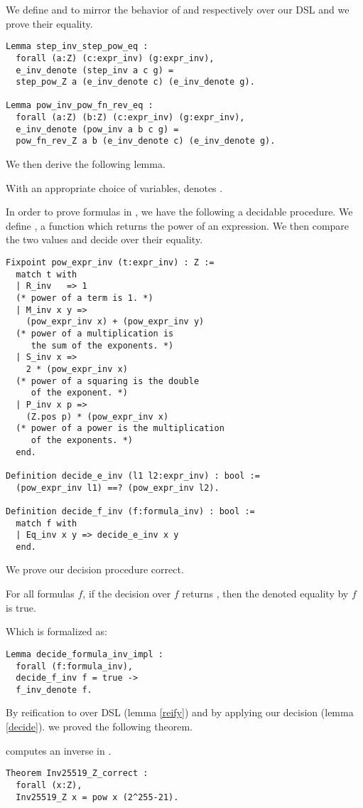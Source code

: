 We define  and  to mirror the behavior of
 and respectively  over our DSL and
we prove their equality.
\begin{lstlisting}[language=Coq]
Lemma step_inv_step_pow_eq :
  forall (a:Z) (c:expr_inv) (g:expr_inv),
  e_inv_denote (step_inv a c g) =
  step_pow_Z a (e_inv_denote c) (e_inv_denote g).

Lemma pow_inv_pow_fn_rev_eq :
  forall (a:Z) (b:Z) (c:expr_inv) (g:expr_inv),
  e_inv_denote (pow_inv a b c g) =
  pow_fn_rev_Z a b (e_inv_denote c) (e_inv_denote g).
\end{lstlisting}
We then derive the following lemma.
\begin{lemma}
\label{reify}
With an appropriate choice of variables,
 denotes .
\end{lemma}

In order to prove formulas in ,
we have the following a decidable procedure.
We define , a function which returns the power of an expression.
We then compare the two values and decide over their equality.
\begin{lstlisting}[language=Coq]
Fixpoint pow_expr_inv (t:expr_inv) : Z :=
  match t with
  | R_inv   => 1
  (* power of a term is 1. *)
  | M_inv x y =>
    (pow_expr_inv x) + (pow_expr_inv y)
  (* power of a multiplication is
     the sum of the exponents. *)
  | S_inv x =>
    2 * (pow_expr_inv x)
  (* power of a squaring is the double
     of the exponent. *)
  | P_inv x p =>
    (Z.pos p) * (pow_expr_inv x)
  (* power of a power is the multiplication
     of the exponents. *)
  end.

Definition decide_e_inv (l1 l2:expr_inv) : bool :=
  (pow_expr_inv l1) ==? (pow_expr_inv l2).

Definition decide_f_inv (f:formula_inv) : bool :=
  match f with
  | Eq_inv x y => decide_e_inv x y
  end.
\end{lstlisting}
We prove our decision procedure correct.
\begin{lemma}
\label{decide}
For all formulas $f$, if the decision over $f$ returns ,
then the denoted equality by $f$ is true.
\end{lemma}
Which is formalized as:
\begin{lstlisting}[language=Coq]
Lemma decide_formula_inv_impl :
  forall (f:formula_inv),
  decide_f_inv f = true ->
  f_inv_denote f.
\end{lstlisting}
By reification to over DSL (lemma \ref{reify}) and by applying our decision (lemma \ref{decide}).
we proved the following theorem.
\begin{theorem}
 computes an inverse in \Zfield.
\end{theorem}
\begin{lstlisting}[language=Coq]
Theorem Inv25519_Z_correct :
  forall (x:Z),
  Inv25519_Z x = pow x (2^255-21).
\end{lstlisting}

